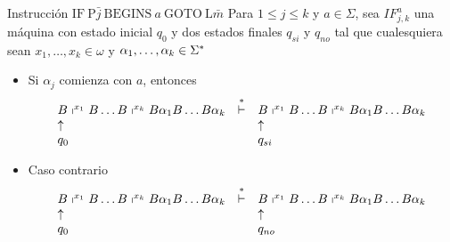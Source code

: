 \begin{frame}
  \begin{block}{Instrucción $\mathrm{IF} \ \mathrm{P}\bar{j} \ \mathrm{BEGINS} \ a \ \mathrm{GOTO} \ \mathrm{L}\bar{m}$}
    \PN Para $1 \leq j \leq k$ y $a \in \Sigma$, sea $IF_{j,k}^{a}$ una máquina con estado inicial $q_{0}$ y dos estados
    finales $q_{si}$ y $q_{no}$ tal que cualesquiera sean $x_{1}, \dotsc, x_{k} \in \omega$ y $\alpha_{1}, \dotsc,
    \alpha_{k} \in \Sigma^{\ast}$
    \begin{itemize}
      \item Si $\alpha_{j}$ comienza con $a$, entonces
      \[
        \begin{array}{lcl}
          B \shortmid^{x_{1}} B \dotsc B \shortmid^{x_{k}} B \alpha_{1} B \dotsc B \alpha_{k} &\overset{\ast}{\vdash}& B
            \shortmid^{x_{1}} B \dotsc B \shortmid^{x_{k}} B \alpha_{1} B \dotsc B \alpha_{k} \\
          \uparrow && \uparrow \\
          q_{0} && q_{si}
        \end{array}
      \]

      \item Caso contrario
      \[
        \begin{array}{lcl}
          B \shortmid^{x_{1}} B \dotsc B \shortmid^{x_{k}} B \alpha_{1} B \dotsc B \alpha_{k} &\overset{\ast}{\vdash}& B
            \shortmid^{x_{1}} B \dotsc B \shortmid^{x_{k}} B \alpha_{1} B \dotsc B \alpha_{k} \\
          \uparrow && \uparrow \\
          q_{0} && q_{no}
        \end{array}
      \]
    \end{itemize}
  \end{block}
\end{frame}
